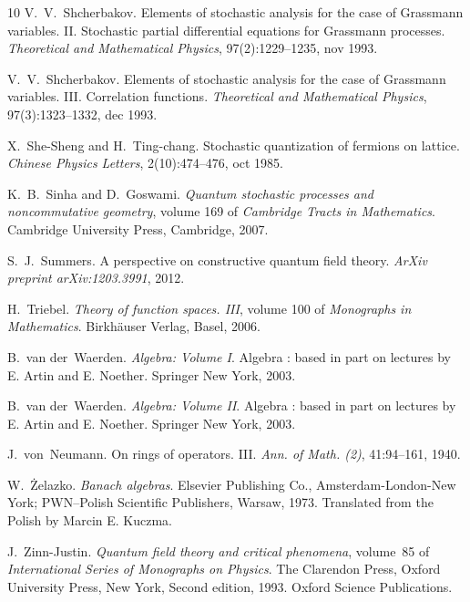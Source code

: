 \documentclass{article}
\newcommand{\tmtextit}[1]{{\itshape{#1}}}
\begin{document}
\begin{thebibliography}{10}
  V.~V.~Shcherbakov.
  {\newblock}Elements of stochastic analysis for the case of Grassmann
  variables. II. Stochastic partial differential equations for Grassmann
  processes. {\newblock}\tmtextit{Theoretical and Mathematical Physics},
  97(2):1229--1235, nov 1993.{\newblock}
  
  V.~V.~Shcherbakov.
  {\newblock}Elements of stochastic analysis for the case of Grassmann
  variables. III. Correlation functions. {\newblock}\tmtextit{Theoretical and
  Mathematical Physics}, 97(3):1323--1332, dec 1993.{\newblock}
  
  X.~She-Sheng  and  H.~Ting-chang.
  {\newblock}Stochastic quantization of fermions on lattice.
  {\newblock}\tmtextit{Chinese Physics Letters}, 2(10):474--476, oct
  1985.{\newblock}
  
  K.~B.~Sinha  and  D.~Goswami.
  {\newblock}\tmtextit{Quantum stochastic processes and noncommutative
  geometry},  volume  169  of \tmtextit{Cambridge Tracts in Mathematics}.
  {\newblock}Cambridge University Press, Cambridge, 2007.{\newblock}
  
  S.~J.~Summers. {\newblock}A perspective
  on constructive quantum field theory. {\newblock}\tmtextit{ArXiv preprint
  arXiv:1203.3991}, 2012.{\newblock}
  
  H.~Triebel. {\newblock}\tmtextit{Theory of function
  spaces. III},  volume  100  of \tmtextit{Monographs in Mathematics}.
  {\newblock}Birkh{\"a}user Verlag, Basel, 2006.{\newblock}
  
  B.~van der~Waerden.
  {\newblock}\tmtextit{Algebra: Volume I}. {\newblock}Algebra : based in part
  on lectures by E. Artin and E. Noether. Springer New York, 2003.{\newblock}
  
  B.~van der~Waerden.
  {\newblock}\tmtextit{Algebra: Volume II}. {\newblock}Algebra : based in part
  on lectures by E. Artin and E. Noether. Springer New York, 2003.{\newblock}
  
  J.~von~Neumann. {\newblock}On rings of operators.
  III. {\newblock}\tmtextit{Ann. of Math. (2)}, 41:94--161, 1940.{\newblock}
  
  W.~{\.Z}elazko. {\newblock}\tmtextit{Banach
  algebras}. {\newblock}Elsevier Publishing Co., Amsterdam-London-New York;
  PWN--Polish Scientific Publishers, Warsaw, 1973. {\newblock}Translated from
  the Polish by Marcin E. Kuczma.{\newblock}
  
  J.~Zinn-Justin. {\newblock}\tmtextit{Quantum field
  theory and critical phenomena},  volume~85  of \tmtextit{International
  Series of Monographs on Physics}. {\newblock}The Clarendon Press, Oxford
  University Press, New York, Second  edition, 1993. {\newblock}Oxford Science
  Publications.{\newblock}
\end{thebibliography}
\end{document}
